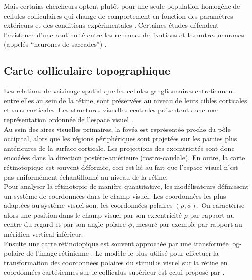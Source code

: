Mais certains chercheurs optent plutôt pour une seule population homogène de cellules colliculaires qui change de comportement en fonction des paramètres extérieurs et des conditions expérimentales \cite {Trappenberg:2001, Droulez:1991}. Certaines études défendent l'existence d'une continuité entre les neurones de fixations et les autres neurones (appelés ``neurones de saccades'') \cite{Munoz:1995a}.\\


\subsection{Carte colliculaire topographique} {\label{retin}}

Les relations de voisinage spatial que les cellules ganglionnaires entretiennent entre elles au sein de la rétine, sont préservées au niveau de leurs cibles  corticales et sous-corticales. Les structures visuelles centrales présentent donc une représentation ordonnée de l'espace visuel \cite{Purves:2004}.\\

Au sein des aires visuelles primaires, la fovéa est représentée proche du pôle occipital, alors que les régions périphériques sont projetées sur les parties plus antérieures de la surface corticale. Les projections des excentricités sont donc encodées dans la direction postéro-antérieure (rostro-caudale). En outre, la carte rétinotopique est souvent déformée, ceci est lié au fait que l'espace visuel n'est pas uniformément échantillonné au niveau de la rétine.\\

Pour analyser la rétinotopie de manière quantitative, les modélisateurs définissent un système de coordonnées dans le champ visuel. Les coordonnées les plus adaptées au système visuel sont les coordonnées polaires $(\rho,\phi)$. On caractérise alors une position dans le champ visuel par son excentricité $\rho$ par rapport au centre du regard et par son angle polaire $\phi$, mesuré par exemple par rapport au méridien vertical inférieur. \\

Ensuite une carte rétinotopique est souvent approchée par une transformée log-polaire de l'image rétinienne \cite{Robinson:1972}. Le modèle le plus utilisé pour effectuer la transformation des coordonnées polaires du stimulus visuel sur la rétine en coordonnées cartésiennes sur le colliculus supérieur est celui proposé par \cite{Ottes:1986}.\\

